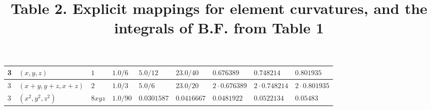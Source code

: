 \documentclass[12pt]{article}
\begin{document}
\begin{landscape}
\begin{center}
\begin{tabular}{ | l | l | l | l | l | l | l | l | l |}
  3 & $(x,y,z)$            & $1$ & $1.0/6$ & $5.0/12$ & $23.0/40$ & $0.676389$ & $0.748214$ & $0.801935$ \\ \hline
  3 & $(x+y,y+z,x+z)$      & $2$ & $1.0/3$ & $5.0/6$ & $23.0/20$ & $2\cdot 0.676389$ & $2\cdot 0.748214$ & $2\cdot 0.801935$ \\ \hline
  3 & $(x^2,y^2,z^2)$      & $8xyz$ & $1.0/90$ & $0.0301587$ & $0.0416667$ & $0.0481922$ & $0.0522134$ & $0.05483$ \\ \hline
\end{tabular} \vfill
\title{Table 2. Explicit mappings for element curvatures, and the integrals of B.F. from Table 1}
\end{center}

\end{landscape}
\end{document}

